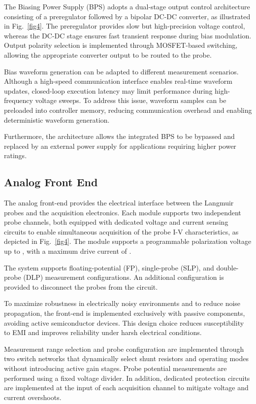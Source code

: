 The Biasing Power Supply (BPS) adopts a dual-stage output control architecture consisting of a preregulator followed by a bipolar DC-DC converter, as illustrated in Fig.~\ref{fig4}. The preregulator provides slow but high-precision voltage control, whereas the DC-DC stage ensures fast transient response during bias modulation. Output polarity selection is implemented through MOSFET-based switching, allowing the appropriate converter output to be routed to the probe.

Bias waveform generation can be adapted to different measurement scenarios. Although a high-speed communication interface enables real-time waveform updates, closed-loop execution latency may limit performance during high-frequency voltage sweeps. To address this issue, waveform samples can be preloaded into controller memory, reducing communication overhead and enabling deterministic waveform generation.

Furthermore, the architecture allows the integrated BPS to be bypassed and replaced by an external power supply for applications requiring higher power ratings.



\subsection{Analog Front End}

The analog front-end provides the electrical interface between the Langmuir probes and the acquisition electronics. Each module supports two independent probe channels, both equipped with dedicated voltage and current sensing circuits to enable simultaneous acquisition of the probe I-V characteristics, as depicted in Fig.~\ref{fig4}. The module supports a programmable polarization voltage up to , with a maximum drive current of .

The system supports floating-potential (FP), single-probe (SLP), and double-probe (DLP) measurement configurations. An additional configuration is provided to disconnect the probes from the circuit.

To maximize robustness in electrically noisy environments and to reduce noise propagation, the front-end is implemented exclusively with passive components, avoiding active semiconductor devices. This design choice reduces susceptibility to EMI and improves reliability under harsh electrical conditions.

Measurement range selection and probe configuration are implemented through two switch networks that dynamically select shunt resistors and operating modes without introducing active gain stages. Probe potential measurements are performed using a fixed voltage divider. In addition, dedicated protection circuits are implemented at the input of each acquisition channel to mitigate voltage and current overshoots.



